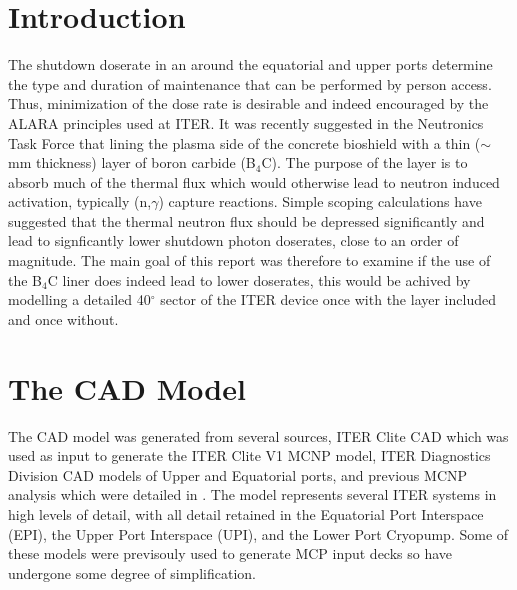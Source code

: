 \documentclass[12pt]{article}
\begin{document}
\maketitle
\newpage
\tableofcontents
\newpage
\section{Introduction}
The shutdown doserate in an around the equatorial and upper ports determine the type and duration of maintenance that can be
performed by person access. Thus, minimization of the dose rate is desirable and indeed encouraged by the ALARA principles used
at ITER. It was recently suggested in the Neutronics Task Force that lining the plasma side of the concrete bioshield with a
thin ($\sim$ mm thickness) layer of boron carbide (B$_4$C). The purpose of the layer is to absorb much of the thermal flux
which would otherwise lead to neutron induced activation, typically (n,$\gamma$) capture reactions. Simple scoping calculations
have suggested that the thermal neutron flux should be depressed significantly and lead to signficantly lower shutdown photon
doserates, close to an order of magnitude. The main goal of this report was therefore to examine if the use of the B$_4$C liner
does indeed lead to lower doserates, this would be achived by modelling a detailed 40$^{\circ}$ sector of the ITER device once
with the layer included and once without.
\newpage
\section{The CAD Model}
The CAD model was generated from several sources, ITER Clite CAD which was used as input to generate the ITER Clite V1 MCNP model, ITER Diagnostics Division CAD models of Upper and Equatorial ports, and previous MCNP analysis which were detailed in \cite{cad_origination}. The model represents several ITER systems in high levels of detail, with all detail retained in the Equatorial Port Interspace (EPI), the  Upper Port Interspace (UPI), and the Lower Port Cryopump. Some of these models were previsouly used to generate MCP input decks so have undergone some degree of simplification. 
\end{document}

